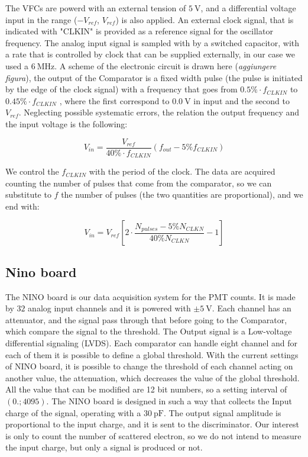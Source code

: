 The VFCs are powerd with an external tension of $\SI{5}{\volt}$, and a differential voltage input in the range ($-V_{ref}$, $V_{ref}$) is also applied. An external clock signal, that is indicated with "CLKIN" is provided as a reference signal for the oscillator frequency.
The analog input signal is sampled with by a switched capacitor, with a rate that is controlled by clock that can be supplied externally, in our case we used a $\SI{6}{\mega \hertz}$. A scheme of the electronic circuit is drawn here (\textit{aggiungere figura}), the output of the Comparator  is a fixed width pulse (the pulse is initiated by the edge of the clock signal) with a frequency that goes from $0.5 \% \cdot f_{CLKIN}$ to $0.45 \% \cdot f_{CLKIN}$ \cite{VfcDatasheet}, where the first correspond to $\SI{0.0}{ \volt}$ in input and the second to $V_{ref}$. Neglecting possible systematic errors, the relation the output frequency and the input voltage is the following:

\begin{equation}
V_{in} = \frac{V_{ref}}{40 \% \cdot f_{CLKIN}} (f_{out} - 5\% f_{CLKIN})
\end{equation}

We control the $f_{CLKIN}$ with the period of the clock. The data are acquired counting the number of pulses that come from the comparator, so we can substitute to $f$ the number of pulses (the two quantities are proportional), and we end with:

\begin{equation} \label{eq:Vfc}
V_{in} =  V_{ref}[2 \cdot \dfrac{N_{pulses} - 5 \% N_{CLKN}}{40 \% N_{CLKN}} - 1]
\end{equation}

\subsection{Nino board} \label{NINO}

The NINO board is our data acquisition system for the PMT counts. It is made by $32$ analog input channels and it is powered with $\pm \SI{5}{\volt}$. Each channel has an attenuator, and the signal pass through that before going to the Comparator, which compare the signal to the threshold. The Output signal is a Low-voltage differential signaling (LVDS). Each comparator can handle eight channel and for each of them it is possible to define a global threshold. With the current settings of NINO board, it is possible to change the threshold of each channel acting on another value, the attenuation, which decreases the value of the global threshold. All the value that can be modified are 12 bit numbers, so a setting interval of $(0. ; 4095)$. \medskip
The NINO board is designed in such a way that collects the Input charge of the signal, operating with a $\SI{30}{\pico \farad}$. The output signal amplitude is proportional to the input charge, and it is sent to the discriminator. Our interest is only to count the number of scattered electron, so we do not intend to measure the input charge, but only a signal is produced or not.

